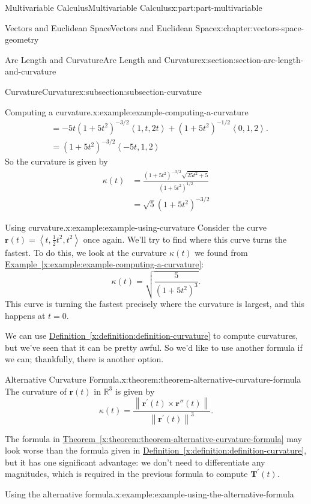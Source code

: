 \documentclass[twoside,10pt,]{book}
\newcommand{\xreffont}{\relax}
\numberwithin{equation}{part}
\newcommand{\RR}{\mathbb{R}}
\newcommand{\norm}[1]{\left\| #1 \right\|}
\newcommand{\dotprod}[1]{\left\langle #1 \right\rangle}
\begin{document}
\begin{partptx}{Multivariable Calculus}{}{Multivariable Calculus}{}{}{x:part:part-multivariable}
\begin{chapterptx}{Vectors and Euclidean Space}{}{Vectors and Euclidean Space}{}{}{x:chapter:vectors-space-geometry}
\begin{sectionptx}{Arc Length and Curvature}{}{Arc Length and Curvature}{}{}{x:section:section-arc-length-and-curvature}
\begin{subsectionptx}{Curvature}{}{Curvature}{}{}{x:subsection:subsection-curvature}
\begin{example}{Computing a curvature.}{x:example:example-computing-a-curvature}
\begin{align*}
& = -5t(1+5t^{2})^{-3/2}\dotprod{1,t,2t} + (1 + 5t^{2})^{-1/2}\dotprod{0,1,2}. \\
& = (1+5t^{2})^{-3/2}\dotprod{-5t,1,2} 
\end{align*}
So the curvature is given by%
%
\begin{align*}
\kappa(t) & = \frac{(1+5t^{2})^{-3/2}\sqrt{25t^{2}+5}}{(1+5t^{2})^{1/2}} \\
& = \sqrt{5}(1+5t^{2})^{-3/2} 
\end{align*}
\end{example}
\begin{example}{Using curvature.}{x:example:example-using-curvature}%
Consider the curve \(\mathbf{r}(t) = \dotprod{t,\frac{1}{2}t^{2},t^{2}}\) once again. We'll try to find where this curve turns the fastest. To do this, we look at the curvature \(\kappa(t)\) we found from \hyperref[x:example:example-computing-a-curvature]{Example~{\xreffont\ref{x:example:example-computing-a-curvature}}}:%
%
\begin{equation*}
\kappa(t) = \sqrt{\frac{5}{(1+5t^{2})^{3}}}.
\end{equation*}
This curve is turning the fastest precisely where the curvature is largest, and this happens at \(t=0\).%
\end{example}
We can use \hyperref[x:definition:definition-curvature]{Definition~{\xreffont\ref{x:definition:definition-curvature}}} to compute curvatures, but we've seen that it can be pretty awful. So we'd like to use another formula if we can; thankfully, there is another option.%
\begin{theorem}{Alternative Curvature Formula.}{}{x:theorem:theorem-alternative-curvature-formula}%
%
The curvature of \(\mathbf{r}(t)\) in \(\RR^{3}\) is given by%
%
\begin{equation*}
\kappa(t) = \frac{\norm{\mathbf{r}^{\prime}(t)\times\mathbf{r}''(t)}}{\norm{\mathbf{r}^{\prime}(t)}^{3}}.
\end{equation*}
\end{theorem}
The formula in \hyperref[x:theorem:theorem-alternative-curvature-formula]{Theorem~{\xreffont\ref{x:theorem:theorem-alternative-curvature-formula}}} may look worse than the formula given in \hyperref[x:definition:definition-curvature]{Definition~{\xreffont\ref{x:definition:definition-curvature}}}, but it has one significant advantage: we don't need to differentiate any magnitudes, which is required in the previous formula to compute \(\mathbf{T}^\prime(t)\).%
\begin{example}{Using the alternative formula.}{x:example:example-using-the-alternative-formula}%

\end{example}
\end{subsectionptx}
\end{sectionptx}
\end{chapterptx}
\end{partptx}
\end{document}
